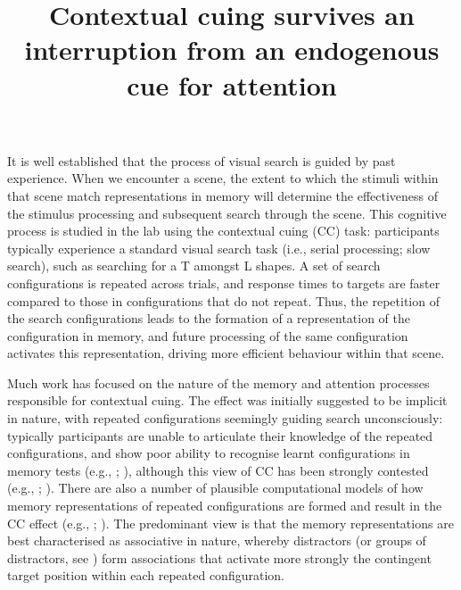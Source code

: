 \documentclass[
  man,
  floatsintext,
  longtable,
  nolmodern,
  notxfonts,
  notimes,
  colorlinks=true,linkcolor=blue,citecolor=blue,urlcolor=blue]{apa7}
\title{Contextual cuing survives an interruption from an endogenous cue
for attention}
\begin{document}
\maketitle


\setcounter{secnumdepth}{-\maxdimen} %

\setlength\LTleft{0pt}

\resetlinenumber[1]

It is well established that the process of visual search is guided by
past experience. When we encounter a scene, the extent to which the
stimuli within that scene match representations in memory will determine
the effectiveness of the stimulus processing and subsequent search
through the scene. This cognitive process is studied in the lab using
the contextual cuing (CC) task: participants typically experience a
standard visual search task (i.e., serial processing; slow search), such
as searching for a T amongst L shapes. A set of search configurations is
repeated across trials, and response times to targets are faster
compared to those in configurations that do not repeat. Thus, the
repetition of the search configurations leads to the formation of a
representation of the configuration in memory, and future processing of
the same configuration activates this representation, driving more
efficient behaviour within that scene.

Much work has focused on the nature of the memory and attention
processes responsible for contextual cuing. The effect was initially
suggested to be implicit in nature, with repeated configurations
seemingly guiding search unconsciously: typically participants are
unable to articulate their knowledge of the repeated configurations, and
show poor ability to recognise learnt configurations in memory tests
(e.g., ;
), although this
view of CC has been strongly contested (e.g.,
;
). There are also a
number of plausible computational models of how memory representations
of repeated configurations are formed and result in the CC effect (e.g.,
;
). The predominant view is
that the memory representations are best characterised as associative in
nature, whereby distractors (or groups of distractors, see
) form associations that
activate more strongly the contingent target position within each
repeated configuration.
\end{document}
